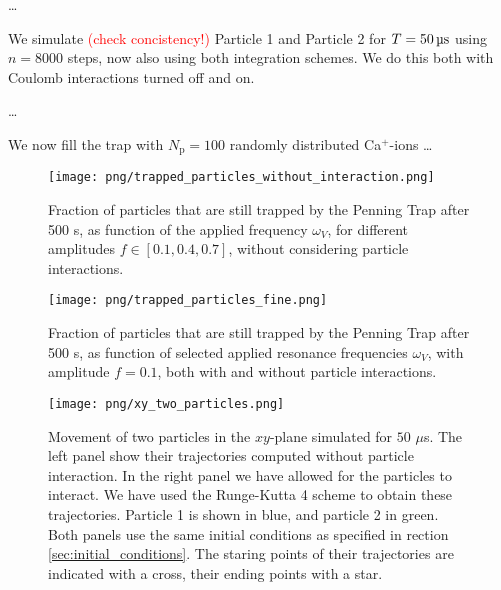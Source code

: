 \dots



We simulate \textcolor{red}{(check concistency!)} Particle 1 and Particle 2 for $T = 50 \,\mathrm{\text{\textmu} s}$ using $n=8000$ steps, now also using both integration schemes. We do this both with Coulomb interactions turned off and on. 


\dots


We now fill the trap with $N_\mathrm{p} = 100$ randomly distributed Ca$^+$-ions \dots

\begin{figure}
    \texttt{[image: png/trapped\_particles\_without\_interaction.png]}
    \caption{Fraction of particles that are still trapped by the Penning Trap after 500 \textmu s, as function of the applied frequency $\omega_V$, for different amplitudes $f\in[0.1, 0.4, 0.7]$, without considering particle interactions.}
    \label{fig:trapped_without}
\end{figure}

\begin{figure}
    \texttt{[image: png/trapped\_particles\_fine.png]}
    \caption{Fraction of particles that are still trapped by the Penning Trap after 500 \textmu s, as function of selected applied resonance frequencies $\omega_V$, with amplitude $f=0.1$, both with and without particle interactions.}
    \label{fig:trapped_with}
\end{figure}



\newpage
\onecolumngrid


\begin{figure}[h!]
    \texttt{[image: png/xy\_two\_particles.png]}
    \caption{Movement of two particles in the $xy$-plane simulated for $50$ $\mu$s. The left panel show their trajectories computed without particle interaction. In the right panel we have allowed for the particles to interact. We have used the Runge-Kutta 4 scheme to obtain these trajectories. Particle 1 is shown in blue, and particle 2 in green. Both panels use the same initial conditions as specified in rection \ref{sec:initial_conditions}. The staring points of their trajectories are indicated with a cross, their ending points with a star. }
    \label{fig:xy_two_particles}
\end{figure}


